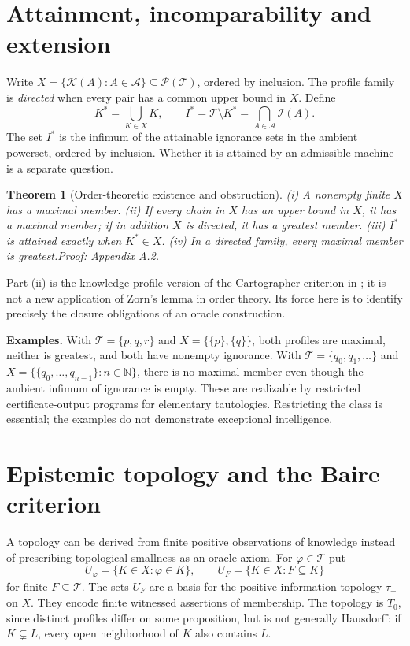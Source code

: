 \documentclass[11pt]{article}
\newtheorem{theorem}{Theorem}[section]
\newcommand{\T}{\mathcal T}\newcommand{\K}{\mathcal K}\newcommand{\I}{\mathcal I}\newcommand{\A}{\mathcal A}
\newcommand{\pf}[1]{\unskip\hspace{.6em plus 1fill}\textit{Proof: Appendix A.#1.}}
\begin{document}
\section{Attainment, incomparability and extension}
Write $X=\{\K(A):A\in\A\}\subseteq\mathcal P(\T)$, ordered by inclusion. The profile family is \emph{directed} when every pair has a common upper bound in $X$. Define
\[
K^*=\bigcup_{K\in X}K,\qquad I^*=\T\setminus K^*=\bigcap_{A\in\A}\I(A).
\]
The set $I^*$ is the infimum of the attainable ignorance sets in the ambient powerset, ordered by inclusion. Whether it is attained by an admissible machine is a separate question.
\begin{theorem}[Order-theoretic existence and obstruction]\label{th:order}
(i) A nonempty finite $X$ has a maximal member. (ii) If every chain in $X$ has an upper bound in $X$, it has a maximal member; if in addition $X$ is directed, it has a greatest member. (iii) $I^*$ is attained exactly when $K^*\in X$. (iv) In a directed family, every maximal member is greatest.\pf{2}
\end{theorem}
Part (ii) is the knowledge-profile version of the Cartographer criterion in \cite[Theorem 20.1]{cart}; it is not a new application of Zorn's lemma in order theory. Its force here is to identify precisely the closure obligations of an oracle construction.

\textbf{Examples.} With $\T=\{p,q,r\}$ and $X=\{\{p\},\{q\}\}$, both profiles are maximal, neither is greatest, and both have nonempty ignorance. With $\T=\{q_0,q_1,\ldots\}$ and $X=\{\{q_0,\ldots,q_{n-1}\}:n\in\mathbb N\}$, there is no maximal member even though the ambient infimum of ignorance is empty. These are realizable by restricted certificate-output programs for elementary tautologies. Restricting the class is essential; the examples do not demonstrate exceptional intelligence.

\section{Epistemic topology and the Baire criterion}
A topology can be derived from finite positive observations of knowledge instead of prescribing topological smallness as an oracle axiom. For $\varphi\in\T$ put
\[
U_\varphi=\{K\in X:\varphi\in K\},\qquad U_F=\{K\in X:F\subseteq K\}
\]
for finite $F\subseteq\T$. The sets $U_F$ are a basis for the positive-information topology $\tau_+$ on $X$. They encode finite witnessed assertions of membership. The topology is $T_0$, since distinct profiles differ on some proposition, but is not generally Hausdorff: if $K\subsetneq L$, every open neighborhood of $K$ also contains $L$.
\end{document}
